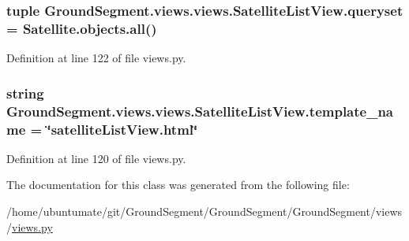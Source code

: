 \subsubsection[{queryset}]{\setlength{\rightskip}{0pt plus 5cm}tuple Ground\+Segment.\+views.\+views.\+Satellite\+List\+View.\+queryset = Satellite.\+objects.\+all()\hspace{0.3cm}{\ttfamily [static]}}\label{class_ground_segment_1_1views_1_1views_1_1_satellite_list_view_a1341165d2c9701d75b8f98d455205268}


Definition at line 122 of file views.\+py.

\hypertarget{class_ground_segment_1_1views_1_1views_1_1_satellite_list_view_a157f3c14fd467b28cca4c569d16d60cd}{}
\subsubsection[{template\+\_\+name}]{\setlength{\rightskip}{0pt plus 5cm}string Ground\+Segment.\+views.\+views.\+Satellite\+List\+View.\+template\+\_\+name = \char`\"{}satellite\+List\+View.\+html\char`\"{}\hspace{0.3cm}{\ttfamily [static]}}\label{class_ground_segment_1_1views_1_1views_1_1_satellite_list_view_a157f3c14fd467b28cca4c569d16d60cd}


Definition at line 120 of file views.\+py.



The documentation for this class was generated from the following file\+:\begin{DoxyCompactItemize}
\item 
/home/ubuntumate/git/\+Ground\+Segment/\+Ground\+Segment/\+Ground\+Segment/views/\hyperlink{views_8py}{views.\+py}\end{DoxyCompactItemize}
